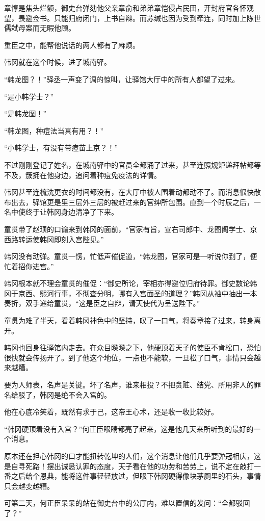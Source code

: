 章惇是焦头烂额，御史台弹劾他父亲章俞和弟弟章恺侵占民田，开封府官各怀观望，畏避佥书。只能归府闭门，上书自辩。而苏缄也因为受到牵连，同时加上陈世儒弑母案而无暇他顾。

重臣之中，能帮他说话的两人都有了麻烦。

韩冈就在这个时候，进了城南驿。

“韩龙图？！”驿丞一声变了调的惊叫，让驿馆大厅中的所有人都望了过来。

“是小韩学士？”

“是韩龙图！”

“韩龙图，种痘法当真有用？！”

“小韩学士，有没有带痘苗上京？！”

不过刚刚登记了姓名，在城南驿中的官员全都涌了过来，甚至连照规矩递拜帖都等不及，簇拥在他身边，追问着种痘免疫法的详情。

韩冈甚至连梳洗更衣的时间都没有，在大厅中被人围着动都动不了。而消息很快散布出去，驿馆更是里三层外三层的被赶过来的官绅所包围。直到一个时辰之后，一名中使终于让韩冈身边清净了下来。

童贯带了赵顼的口谕来到韩冈的面前，“官家有旨，宣右司郎中、龙图阁学士、京西路转运使韩冈即刻入宫陛见。”

韩冈没有动弹。童贯一愣，忙低声催促道，“韩龙图，官家可是一听说你到了，便忙着招你进宫。”

韩冈根本就不理会童贯的催促：“御史所论，宰相亦得避位归府待罪。御史数论韩冈于京西、熙河行事，不彻查分明，哪有入宫面圣的道理？”韩冈从袖中抽出一本奏折，双手递给童贯，“这是臣之自辩，请天使代为呈送陛下。”

童贯为难了半天，看着韩冈神色中的坚持，叹了一口气，将奏章接了过来，转身离开。

韩冈也回身往驿馆内走去。在众目睽睽之下，他硬顶着天子的使臣不肯松口，恐怕很快就会传扬开了。到了他这个地位，一点也不能软，一旦松了口气，事情只会越来越糟。

要为人师表，名声是关键。坏了名声，谁来相投？不把贪赃、结党、所用非人的罪名给驳了，韩冈是绝不会入宫的。

他在心底冷笑着，既然有求于己，这帝王心术，还是收一收比较好。

“韩冈硬顶着没有入宫？”何正臣眼睛都亮了起来，这是他几天来所听到的最好的一个消息。

原本还在担心韩冈的口才能扭转乾坤的人们，这个消息让他们几乎要弹冠相庆，这是自寻死路！摆出诚恳认罪的态度，天子看在他的功劳和苦劳上，说不定在敲打一番之后给个恩典，能将这件事轻轻放过，但眼下韩冈硬得像块茅厕里的石头，事情只会越变越糟。

可第二天，何正臣呆呆的站在御史台中的公厅内，难以置信的发问：“全都驳回了？”

